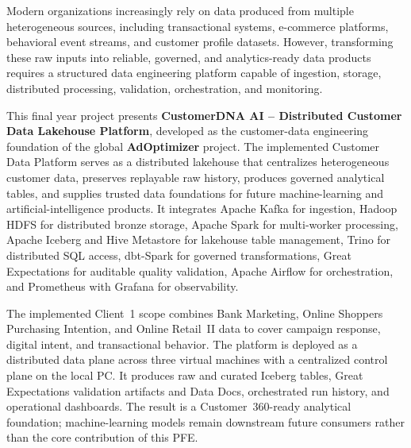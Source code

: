 Modern organizations increasingly rely on data produced from multiple heterogeneous sources, including transactional systems, e-commerce platforms, behavioral event streams, and customer profile datasets. However, transforming these raw inputs into reliable, governed, and analytics-ready data products requires a structured data engineering platform capable of ingestion, storage, distributed processing, validation, orchestration, and monitoring.

This final year project presents \textbf{CustomerDNA AI -- Distributed Customer Data Lakehouse Platform}, developed as the customer-data engineering foundation of the global \textbf{AdOptimizer} project. The implemented Customer Data Platform serves as a distributed lakehouse that centralizes heterogeneous customer data, preserves replayable raw history, produces governed analytical tables, and supplies trusted data foundations for future machine-learning and artificial-intelligence products. It integrates Apache Kafka for ingestion, Hadoop HDFS for distributed bronze storage, Apache Spark for multi-worker processing, Apache Iceberg and Hive Metastore for lakehouse table management, Trino for distributed SQL access, dbt-Spark for governed transformations, Great Expectations for auditable quality validation, Apache Airflow for orchestration, and Prometheus with Grafana for observability.

The implemented Client~1 scope combines Bank Marketing, Online Shoppers Purchasing Intention, and Online Retail~II data to cover campaign response, digital intent, and transactional behavior. The platform is deployed as a distributed data plane across three virtual machines with a centralized control plane on the local PC. It produces raw and curated Iceberg tables, Great Expectations validation artifacts and Data Docs, orchestrated run history, and operational dashboards. The result is a Customer~360-ready analytical foundation; machine-learning models remain downstream future consumers rather than the core contribution of this PFE.

